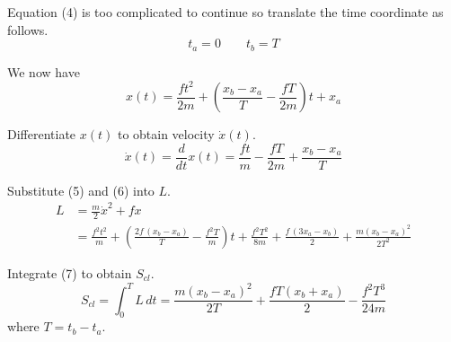 \documentclass[12pt]{article}
\begin{document}
Equation (4) is too complicated to continue so translate the time coordinate as follows.
\begin{equation*}
t_a=0
\qquad
t_b=T
\end{equation*}

We now have
\begin{equation*}
x(t)=\frac{ft^2}{2m}+\left(\frac{x_b-x_a}{T}-\frac{fT}{2m}\right)t+x_a
\tag{5}
\end{equation*}

Differentiate $x(t)$ to obtain velocity $\dot x(t)$.
\begin{equation*}
\dot x(t)=
\frac{d}{dt}x(t)=\frac{ft}{m}-\frac{fT}{2m}+\frac{x_b-x_a}{T}
\tag{6}
\end{equation*}

Substitute (5) and (6) into $L$.
\begin{align*}
L&=\frac{m}{2}\dot x^2+fx
\\[1ex]
&=\frac{f^2t^2}{m}
+\left(\frac{2f\,(x_b-x_a)}{T}-\frac{f^2T}{m}\right)t
+\frac{f^2T^2}{8m}
+\frac{f\,(3x_a-x_b)}{2}
+\frac{m(x_b-x_a)^2}{2T^2}
\tag{7}
\end{align*}

Integrate (7) to obtain $S_{cl}$.
\begin{equation*}
S_{cl}=\int_0^T L\,dt
=\frac{m(x_b-x_a)^2}{2T}+\frac{fT(x_b+x_a)}{2}-\frac{f^2T^3}{24m}
\tag{8}
\end{equation*}
where $T=t_b-t_a$.
\end{document}
